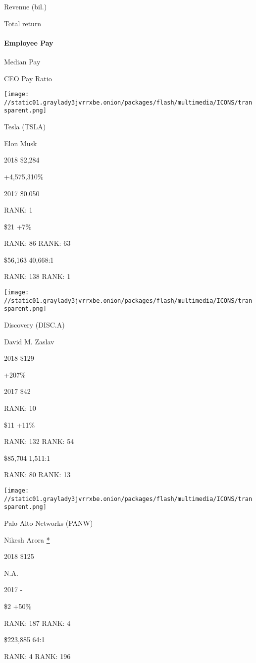 Revenue (bil.)

Total return

\hypertarget{employee-pay}{%
\paragraph{Employee Pay}\label{employee-pay}}

Median Pay

CEO Pay Ratio

\texttt{[image: //static01.graylady3jvrrxbe.onion/packages/flash/multimedia/ICONS/transparent.png]}

Tesla (TSLA)

Elon Musk \protect\hyperlink{g-footnotes}{}

2018 \$2,284

 +4,575,310\%

2017 \$0.050

RANK: 1

 \$21 +7\%

RANK: 86 RANK: 63

 \$56,163 40,668:1

RANK: 138 RANK: 1

\texttt{[image: //static01.graylady3jvrrxbe.onion/packages/flash/multimedia/ICONS/transparent.png]}

Discovery (DISC.A)

David M. Zaslav \protect\hyperlink{g-footnotes}{}

2018 \$129

 +207\%

2017 \$42

RANK: 10

 \$11 +11\%

RANK: 132 RANK: 54

 \$85,704 1,511:1

RANK: 80 RANK: 13

\texttt{[image: //static01.graylady3jvrrxbe.onion/packages/flash/multimedia/ICONS/transparent.png]}

Palo Alto Networks (PANW)

Nikesh Arora \protect\hyperlink{g-footnotes}{*}

2018 \$125

 N.A.

2017 -

 \$2 +50\%

RANK: 187 RANK: 4

 \$223,885 64:1

RANK: 4 RANK: 196

